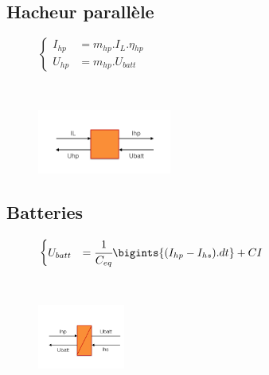 \subsection{Hacheur parallèle}
\vspace{-10px}
\begin{figure}[ht]
\centering
\begin{minipage}{.5\textwidth}  
\centering
$\begin{cases}
	I_{hp} &= m_{hp}.I_{L}.\eta{}_{hp}\\
	U_{hp} &= m_{hp}.U_{batt}
\end{cases}$
\end{minipage}~
\begin{minipage}{.5\textwidth}
  \centering
\includegraphics[height=80px]{images/Chopperp.png}
\end{minipage}
\end{figure}
\FloatBarrier
\vspace{-20px}

\subsection{Batteries}
\vspace{-10px}
\begin{figure}[ht!]
\centering
\begin{minipage}{.5\textwidth}  
\centering
$\begin{cases}
	 U_{batt} &= \cfrac{1}{C_{eq}}\bigints{(I_{hp}-I_{hs}).dt}+CI
\end{cases}$
\end{minipage}~
\begin{minipage}{.5\textwidth}
  \centering
\includegraphics[height=80px]{images/Batteries.png}
\end{minipage}
\end{figure}
\FloatBarrier
\vspace{-20px}

\newpage
